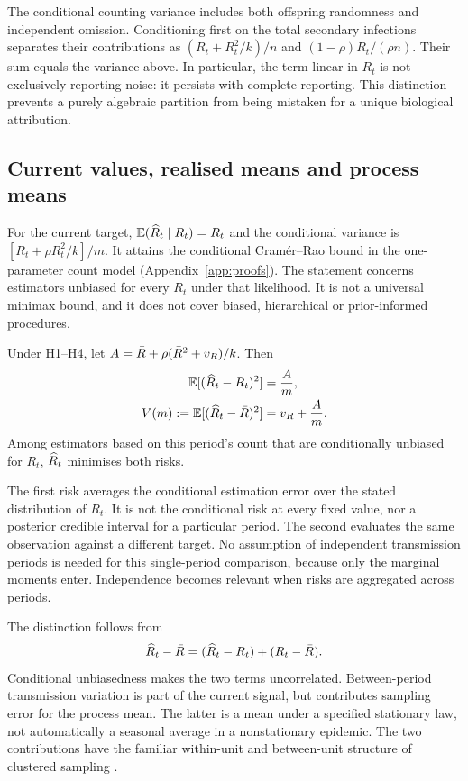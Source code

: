The conditional counting variance includes both offspring randomness and independent omission. Conditioning first on the total secondary infections separates their contributions as $(R_t+R_t^2/k)/n$ and $(1-\rho)R_t/(\rho n)$. Their sum equals the variance above. In particular, the term linear in $R_t$ is not exclusively reporting noise: it persists with complete reporting. This distinction prevents a purely algebraic partition from being mistaken for a unique biological attribution.

\subsection{Current values, realised means and process means}
\label{sec:bg-variance}

For the current target, $\mathbb{E}(\widehat R_t\mid R_t)=R_t$ and the conditional variance is $[R_t+\rho R_t^2/k]/m$. It attains the conditional Cram\'er--Rao bound in the one-parameter count model (Appendix~\ref{app:proofs}). The statement concerns estimators unbiased for every $R_t$ under that likelihood. It is not a universal minimax bound, and it does not cover biased, hierarchical or prior-informed procedures.

\begin{proposition}
\label{prop:average}
Under H1--H4, let $A=\bar R+\rho(\bar R^2+v_R)/k$. Then
\begin{equation}
\begin{aligned}
  \mathbb{E}[(\widehat R_t-R_t)^2]&=\frac{A}{m},\\
  V(m):=\mathbb{E}[(\widehat R_t-\bar R)^2]&=v_R+\frac{A}{m}.
\end{aligned}
  \label{eq:var-average}
\end{equation}
Among estimators based on this period's count that are conditionally unbiased for $R_t$, $\widehat R_t$ minimises both risks.
\end{proposition}

The first risk averages the conditional estimation error over the stated distribution of $R_t$. It is not the conditional risk at every fixed value, nor a posterior credible interval for a particular period. The second evaluates the same observation against a different target. No assumption of independent transmission periods is needed for this single-period comparison, because only the marginal moments enter. Independence becomes relevant when risks are aggregated across periods.

The distinction follows from
\begin{equation}
  \widehat R_t-\bar R=(\widehat R_t-R_t)+(R_t-\bar R).
  \label{eq:error-split}
\end{equation}
Conditional unbiasedness makes the two terms uncorrelated. Between-period transmission variation is part of the current signal, but contributes sampling error for the process mean. The latter is a mean under a specified stationary law, not automatically a seasonal average in a nonstationary epidemic. The two contributions have the familiar within-unit and between-unit structure of clustered sampling \citep{cochran1977sampling, engen1998demographic}.


